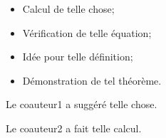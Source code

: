 \setcounter{corA}{0} %
\anglais


\contributions%
{
    \begin{itemize}
        \item Calcul de telle chose;
        \item Vérification de telle équation;
        \item Idée pour telle définition;
        \item Démonstration de tel théorème.
    \end{itemize}

    Le coauteur1 a suggéré telle chose.

    Le coauteur2 a fait telle calcul.\\[1cm]
}

